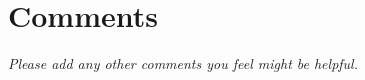 \documentclass[article,twoside]{memoir}
\newcommand*{\fillunderscore}{~\hrulefill}
\newcommand{\header}[1]{\textsl{#1}\par\medskip}
\begin{document}
\fillunderscore\par
\fillunderscore\par
\fillunderscore\par
\fillunderscore\par
\fillunderscore\par
\fillunderscore\par


\chapter{Comments}

\header{Please add any other comments you feel might be helpful.}

\fillunderscore\par
\fillunderscore\par
\fillunderscore\par
\fillunderscore\par
\fillunderscore\par
\fillunderscore\par
\fillunderscore\par
\fillunderscore\par
\fillunderscore
\end{document}
